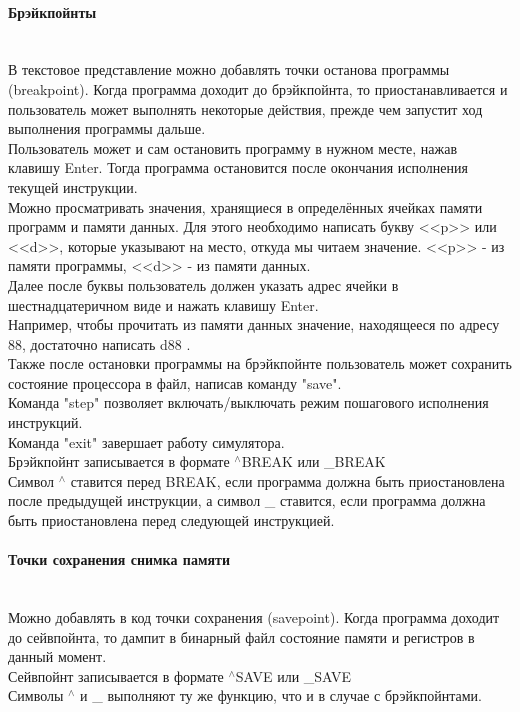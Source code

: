\paragraph{Брэйкпойнты}~\\
В текстовое представление можно добавлять точки останова программы (breakpoint). Когда программа доходит до брэйкпойнта, то приостанавливается и пользователь может выполнять некоторые действия, прежде чем запустит ход выполнения программы дальше.\\
Пользователь может и сам остановить программу в нужном месте, нажав клавишу Enter. Тогда программа остановится после окончания исполнения текущей инструкции. \\
Можно просматривать значения, хранящиеся в определённых ячейках памяти программ и памяти данных. Для этого необходимо написать букву <<p>> или <<d>>, которые указывают на место, откуда мы читаем значение. <<p>> - из памяти программы, <<d>> - из памяти данных. \\
Далее после буквы пользователь должен указать адрес ячейки в шестнадцатеричном виде и нажать клавишу Enter. \\
Например, чтобы прочитать из памяти данных значение, находящееся по адресу 88, достаточно написать d88 . \\
Также после остановки программы на брэйкпойнте пользователь может сохранить состояние процессора в файл, написав команду "save". \\
Команда "step" позволяет включать/выключать режим пошагового исполнения инструкций. \\
Команда "exit" завершает работу симулятора. \\
Брэйкпойнт записывается в формате $^\wedge$BREAK или \_BREAK \\
Символ $^\wedge$ ставится перед BREAK, если программа должна быть приостановлена после предыдущей инструкции, а символ \_ ставится, если программа должна быть приостановлена перед следующей инструкцией.

\paragraph{Точки сохранения снимка памяти}~\\
Можно добавлять в код точки сохранения (savepoint). Когда программа доходит до сейвпойнта, то дампит в бинарный файл состояние памяти и регистров в данный момент.\\
Сейвпойнт записывается в формате $^\wedge$SAVE или \_SAVE \\
Символы $^\wedge$ и \_ выполняют ту же функцию, что и в случае с брэйкпойнтами. \\

